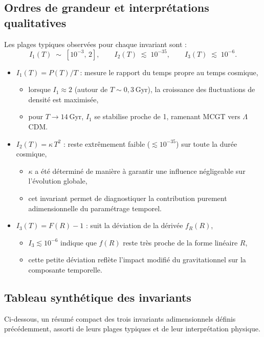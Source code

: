 \subsection{Ordres de grandeur et interprétations qualitatives}
Les plages typiques observées pour chaque invariant sont :
\[
  I_{1}(T)\;\sim\;[10^{-3},\,2],
  \qquad
  I_{2}(T)\;\lesssim\;10^{-35},
  \qquad
  I_{3}(T)\;\lesssim\;10^{-6}.
\]
\begin{itemize}
  \item \textbf{$I_{1}(T) = P(T)/T$} : mesure le rapport du temps propre au temps cosmique,
    \begin{itemize}
      \item lorsque $I_{1}\approx 2$ (autour de $T\sim0{,}3$ Gyr), la croissance des fluctuations de densité est maximisée,
      \item pour $T\to 14$ Gyr, $I_{1}$ se stabilise proche de 1, ramenant MCGT vers $\Lambda$CDM.
    \end{itemize}
  \item \textbf{$I_{2}(T) = \kappa\,T^{2}$} : reste extrêmement faible ($\lesssim10^{-35}$) sur toute la durée cosmique,
    \begin{itemize}
      \item $\kappa$ a été déterminé de manière à garantir une influence négligeable sur l’évolution globale,
      \item cet invariant permet de diagnostiquer la contribution purement adimensionnelle du paramétrage temporel.
    \end{itemize}
  \item \textbf{$I_{3}(T) = F(R) - 1$} : suit la déviation de la dérivée $f_{R}(R)$,
    \begin{itemize}
      \item $I_{3}\lesssim10^{-6}$ indique que $f(R)$ reste très proche de la forme linéaire $R$,
      \item cette petite déviation reflète l’impact modifié du gravitationnel sur la composante temporelle.
    \end{itemize}
\end{itemize}

\subsection{Tableau synthétique des invariants}

Ci-dessous, un résumé compact des trois invariants adimensionnels définis précédemment, assorti de leurs plages typiques et de leur interprétation physique.


